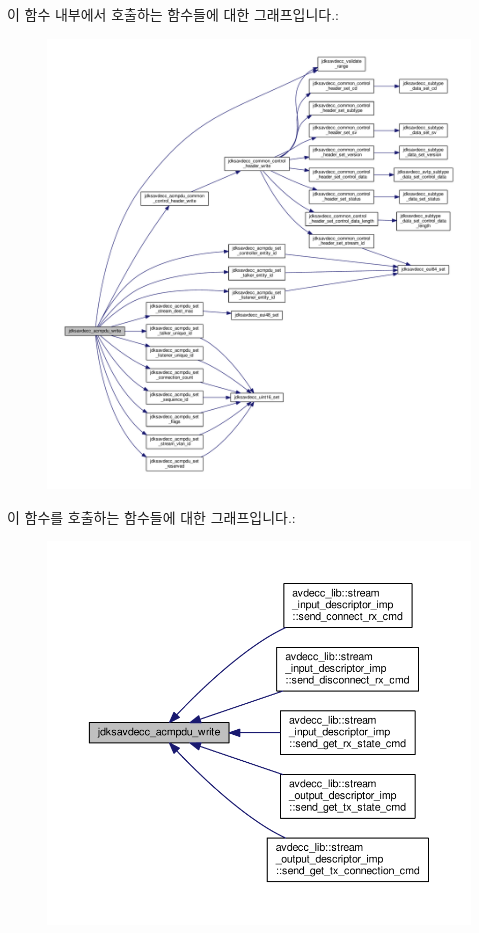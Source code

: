 이 함수 내부에서 호출하는 함수들에 대한 그래프입니다.\+:
\nopagebreak
\begin{figure}[H]
\begin{center}
\leavevmode
\includegraphics[width=350pt]{group__acmpdu_ga8cf8b61ba149419878384da1540d9673_cgraph}
\end{center}
\end{figure}




이 함수를 호출하는 함수들에 대한 그래프입니다.\+:
\nopagebreak
\begin{figure}[H]
\begin{center}
\leavevmode
\includegraphics[width=350pt]{group__acmpdu_ga8cf8b61ba149419878384da1540d9673_icgraph}
\end{center}
\end{figure}


